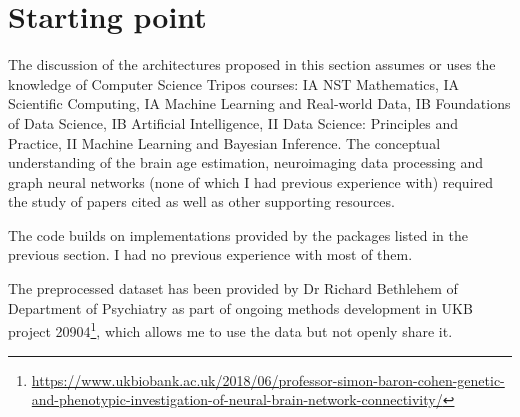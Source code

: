 \section{Starting point}
The discussion of the architectures proposed in this section assumes or uses the knowledge of Computer Science Tripos courses: IA NST Mathematics, IA Scientific Computing, IA Machine Learning and Real-world Data, IB Foundations of Data Science, IB Artificial Intelligence, II Data Science: Principles and Practice, II Machine Learning and Bayesian Inference. The conceptual understanding of the brain age estimation, neuroimaging data processing and graph neural networks (none of which I had previous experience with) required the study of papers cited as well as other supporting resources.

The code builds on implementations provided by the packages listed in the previous section. I had no previous experience with most of them.

The preprocessed dataset has been provided by Dr Richard Bethlehem of Department of Psychiatry as part of ongoing methods development in UKB project 20904\footnote{\url{https://www.ukbiobank.ac.uk/2018/06/professor-simon-baron-cohen-genetic-and-phenotypic-investigation-of-neural-brain-network-connectivity/}}, which allows me to use the data but not openly share it.